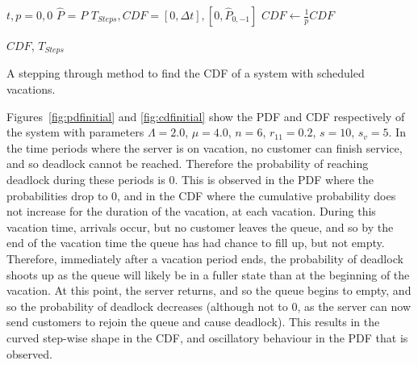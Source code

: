 \documentclass{article}
\begin{document}
\begin{algorithm}[!hbtp]
\DontPrintSemicolon
{}

\BlankLine

$t, p = 0, 0$\;
$\hat{P}$ = $P$\;
$T_{Steps}, CDF = [0, \Delta t], [0, \hat{P}_{0, -1}]$\;
$CDF \leftarrow \frac{1}{p}CDF$\;
\BlankLine

\KwRet $CDF$, $T_{Steps}$
\caption{A stepping through method to find the CDF of a system with scheduled vacations.}
\label{alg:findcdfSV}
\end{algorithm}



Figures~\ref{fig:pdfinitial} and \ref{fig:cdfinitial} show the PDF and CDF respectively of the system with parameters $\Lambda = 2.0$, $\mu = 4.0$, $n = 6$, $r_{11} = 0.2$, $s = 10$, $s_v = 5$.
In the time periods where the server is on vacation, no customer can finish service, and so deadlock cannot be reached.
Therefore the probability of reaching deadlock during these periods is $0$.
This is observed in the PDF where the probabilities drop to $0$, and in the CDF where the cumulative probability does not increase for the duration of the vacation, at each vacation.
During this vacation time, arrivals occur, but no customer leaves the queue, and so by the end of the vacation time the queue has had chance to fill up, but not empty.
Therefore, immediately after a vacation period ends, the probability of deadlock shoots up as the queue will likely be in a fuller state than at the beginning of the vacation.
At this point, the server returns, and so the queue begins to empty, and so the probability of deadlock decreases (although not to $0$, as the server can now send customers to rejoin the queue and cause deadlock).
This results in the curved step-wise shape in the CDF, and oscillatory behaviour in the PDF that is observed.
\end{document}
